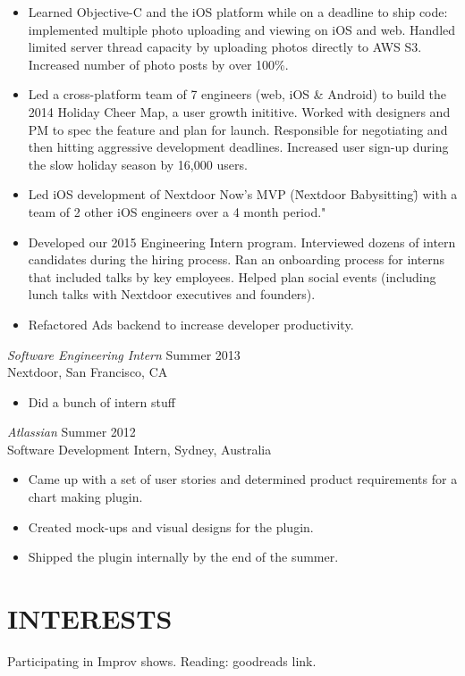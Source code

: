 \documentclass[margin, 10pt]{res} %
\begin{document}
\begin{resume}
\begin{itemize} \itemsep -2pt %
\item Learned Objective-C and the iOS platform while on a deadline to ship code: implemented multiple photo uploading and viewing on iOS and web. Handled limited server thread capacity by uploading photos directly to AWS S3. Increased number of photo posts by over 100\%. 
\item Led a cross-platform team of 7 engineers (web, iOS \& Android) to build the 2014 Holiday Cheer Map, a user growth inititive. Worked with designers and PM to spec the feature and plan for launch. Responsible for negotiating and then hitting aggressive development deadlines. Increased user sign-up during the slow holiday season by 16,000 users.
\item Led iOS development of Nextdoor Now's MVP (\"Nextdoor Babysitting\") with a team of 2 other iOS engineers over a 4 month period."
\item Developed our 2015 Engineering Intern program. Interviewed dozens of intern candidates during the hiring process. Ran an onboarding process for interns that included talks by key employees. Helped plan social events (including lunch talks with Nextdoor executives and founders).
\item Refactored Ads backend to increase developer productivity.
\end{itemize}
 
{\sl Software Engineering Intern} \hfill Summer 2013 \\
Nextdoor, San Francisco, CA 
\begin{itemize} 
\item Did a bunch of intern stuff
\end{itemize} 

{\sl Atlassian} \hfill Summer 2012 \\
Software Development Intern, Sydney, Australia
\begin{itemize}
\item Came up with a set of user stories and determined product requirements for a chart making plugin.
\item Created mock-ups and visual designs for the plugin.
\item Shipped the plugin internally by the end of the summer.
\end{itemize} 


\section{INTERESTS}

Participating in Improv shows.
Reading: goodreads link.


\end{resume}
\end{document}
